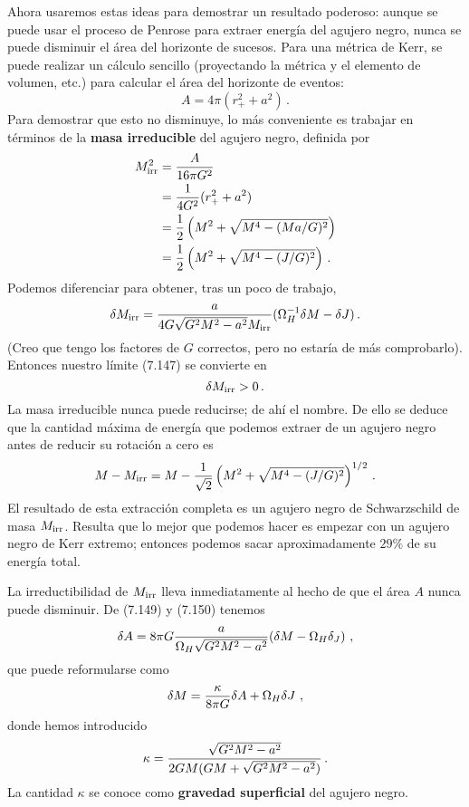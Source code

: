 \documentclass[11pt,b5paper,openany,twoside]{book}
\begin{document}
Ahora usaremos estas ideas para demostrar un resultado poderoso: aunque se puede usar el proceso de Penrose para extraer energía del agujero negro, nunca se puede disminuir el área del horizonte de sucesos.
Para una métrica de Kerr, se puede realizar un cálculo sencillo (proyectando la métrica y el elemento de volumen, etc.) para calcular el área del horizonte de eventos:
\begin{equation}
A = 4\pi(r_+^2 + a^2)\,.\label{7.148}
\end{equation}
Para demostrar que esto no disminuye, lo más conveniente es trabajar en términos de la {\bf masa irreducible} del agujero negro, definida por
\begin{align}
M_{\rm irr}^2  &=  {{A}\over {16\pi G^2}} \notag \\
&=  {{1\over {4G^2}}}(r_+^2 + a^2) \notag \\
&=  {1\over {2}}\left(M^2 + \sqrt{M^4-(Ma/G)^2}\right) \notag \\
&=  {1\over {2}}\left(M^2 + \sqrt{M^4-(J/G)^2}\right)\,.
\label{7.149}
\end{align}
Podemos diferenciar para obtener, tras un poco de trabajo,
\begin{equation}
\delta M_{\rm irr} = {{a}\over{4G\sqrt{G^2M^2-a^2}M_{\rm irr}}}
(\Omega_H^{-1}\delta M - \delta J)\,.\label{7.150}
\end{equation}
(Creo que tengo los factores de $G$ correctos, pero no estaría de más comprobarlo).
Entonces nuestro límite (7.147) se convierte en
\begin{equation}
\delta M_{\rm irr} >0\,.\label{7.151}
\end{equation}
La masa irreducible nunca puede reducirse; de ahí el nombre.
De ello se deduce que la cantidad máxima de energía que podemos extraer de un agujero negro antes de reducir su rotación a cero es
\begin{equation}
M-M_{\rm irr} = M-{1\over\sqrt2}
\left(M^2 + \sqrt{M^4-(J/G)^2}\right)^{1/2}\,.\label{7.152}
\end{equation}
El resultado de esta extracción completa es un agujero negro de Schwarzschild de masa $M_{\rm irr}$.
Resulta que lo mejor que podemos hacer es empezar con un agujero negro de Kerr extremo; entonces podemos sacar aproximadamente $29\%$ de su energía total.

La irreductibilidad de $M_{\rm irr}$ lleva inmediatamente al hecho de que el área $A$ nunca puede disminuir.
De (7.149) y (7.150) tenemos
\begin{equation}
\delta A = 8\pi G{a\over{\Omega_H\sqrt{G^2M^2-a^2}}}
(\delta M - \Omega_H\delta_J)\ ,\label{7.153}
\end{equation}
que puede reformularse como
\begin{equation}
\delta M = {{\kappa}\over{8\pi G}}\delta A +\Omega_H
\delta J\ ,\label{7.154}
\end{equation}
donde hemos introducido
\begin{equation}
\kappa = {{\sqrt{G^2M^2-a^2}}\over{2GM(GM+
\sqrt{G^2M^2-a^2})}}				\,.\label{7.155}
\end{equation}
La cantidad $\kappa$ se conoce como {\bf gravedad superficial} del agujero negro.
\end{document}
